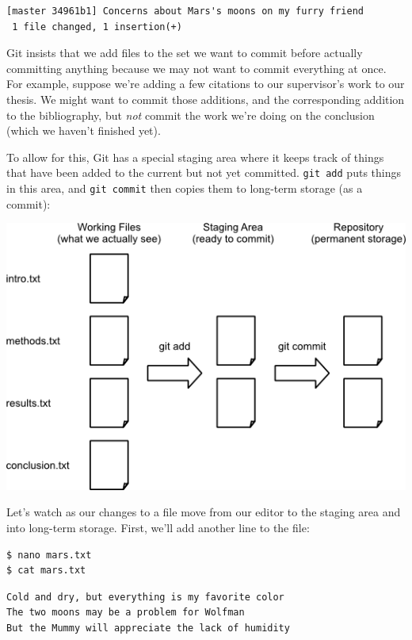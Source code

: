 \documentclass{book}
\begin{document}
\begin{verbatim}
[master 34961b1] Concerns about Mars's moons on my furry friend
 1 file changed, 1 insertion(+)
\end{verbatim}

Git insists that we add files to the set we want to commit before
actually committing anything because we may not want to commit
everything at once. For example, suppose we're adding a few citations to
our supervisor's work to our thesis. We might want to commit those
additions, and the corresponding addition to the bibliography, but
\emph{not} commit the work we're doing on the conclusion (which we
haven't finished yet).

To allow for this, Git has a special staging area where it keeps track
of things that have been added to the current
 but not yet committed.
\texttt{git add} puts things in this area, and \texttt{git commit} then
copies them to long-term storage (as a commit):

\includegraphics{novice/git/img/git-staging-area.png}

Let's watch as our changes to a file move from our editor to the staging
area and into long-term storage. First, we'll add another line to the
file:

\begin{verbatim}
$ nano mars.txt
$ cat mars.txt
\end{verbatim}

\begin{verbatim}
Cold and dry, but everything is my favorite color
The two moons may be a problem for Wolfman
But the Mummy will appreciate the lack of humidity
\end{verbatim}
\end{document}
